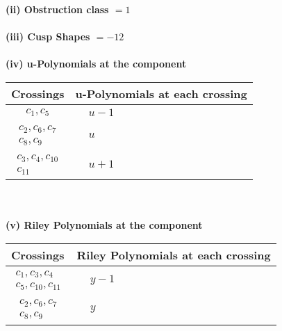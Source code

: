 \documentclass[1p]{elsarticle_modified}
\theoremstyle{definition}
\begin{document}
\flushleft \textbf{(ii) Obstruction class $= 1$}\\~\\
\flushleft \textbf{(iii) Cusp Shapes $= -12$}\\~\\
\newpage\renewcommand{\arraystretch}{1}
\flushleft \textbf{(iv) u-Polynomials at the component}\newline \\
\begin{tabular}{m{50pt}|m{274pt}}
Crossings & \hspace{64pt}u-Polynomials at each crossing \\
\hline $$\begin{aligned}c_{1},c_{5}\end{aligned}$$&$\begin{aligned}
&u-1
\end{aligned}$\\
\hline $$\begin{aligned}c_{2},c_{6},c_{7}\\c_{8},c_{9}\end{aligned}$$&$\begin{aligned}
&u
\end{aligned}$\\
\hline $$\begin{aligned}c_{3},c_{4},c_{10}\\c_{11}\end{aligned}$$&$\begin{aligned}
&u+1
\end{aligned}$\\
\hline
\end{tabular}\\~\\
\newpage\renewcommand{\arraystretch}{1}
\flushleft \textbf{(v) Riley Polynomials at the component}\newline \\
\begin{tabular}{m{50pt}|m{274pt}}
Crossings & \hspace{64pt}Riley Polynomials at each crossing \\
\hline $$\begin{aligned}c_{1},c_{3},c_{4}\\c_{5},c_{10},c_{11}\end{aligned}$$&$\begin{aligned}
&y-1
\end{aligned}$\\
\hline $$\begin{aligned}c_{2},c_{6},c_{7}\\c_{8},c_{9}\end{aligned}$$&$\begin{aligned}
&y
\end{aligned}$\\
\hline
\end{tabular}\\~\\
\end{document}
